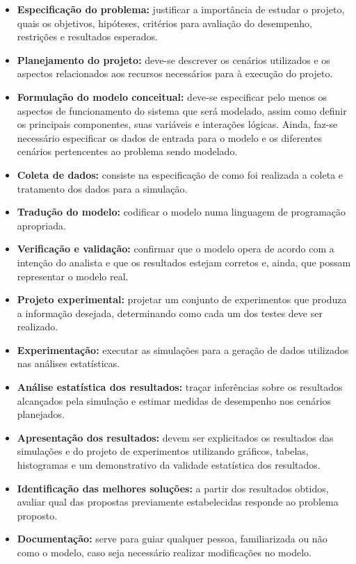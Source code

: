 \documentclass[pt,disc,oneside]{ufscpgeasthesis}
\begin{document}
			\begin{itemize}
				\item{\textbf{Especificação do problema:}} justificar a importância de estudar o projeto, quais os objetivos, hipóteses, critérios para avaliação do desempenho, restrições e resultados esperados.
				\item{\textbf{Planejamento do projeto:}} deve-se descrever os cenários utilizados e os aspectos relacionados aos recursos necessários para à execução do projeto.
				\item{\textbf{Formulação do modelo conceitual:}} deve-se especificar pelo menos os aspectos de funcionamento do sistema que será modelado, assim como definir os principais componentes, suas variáveis e interações lógicas.
				Ainda, faz-se necessário especificar os dados de entrada para o modelo e os diferentes cenários pertencentes ao problema sendo modelado.
				\item{\textbf{Coleta de dados:}} consiste na especificação de como foi realizada a coleta e tratamento dos dados para a simulação.
				\item{\textbf{Tradução do modelo:}} codificar o modelo numa linguagem de programação apropriada.
				\item{\textbf{Verificação e validação:}} confirmar que o modelo opera de acordo com a intenção do analista e que os resultados estejam corretos e, ainda, que possam representar o modelo real.
				\item{\textbf{Projeto experimental:}} projetar um conjunto de experimentos que produza a informação desejada, determinando como cada um dos testes deve ser realizado.
				\item{\textbf{Experimentação:}} executar as simulações para a geração de dados utilizados nas análises estatísticas.
				\item{\textbf{Análise estatística dos resultados:}} traçar inferências sobre os resultados alcançados pela simulação e estimar medidas de desempenho nos cenários planejados.
				\item{\textbf{Apresentação dos resultados:}} devem ser explicitados os resultados das simulações e do projeto de experimentos utilizando gráficos, tabelas, histogramas e um demonstrativo da validade estatística dos resultados.
				\item{\textbf{Identificação das melhores soluções:}} a partir dos resultados obtidos, avaliar qual das propostas previamente estabelecidas responde ao problema proposto.
				\item{\textbf{Documentação:}} serve para guiar qualquer pessoa, familiarizada ou não como o modelo, caso seja necessário realizar modificações no modelo.
			\end{itemize}
\end{document}

